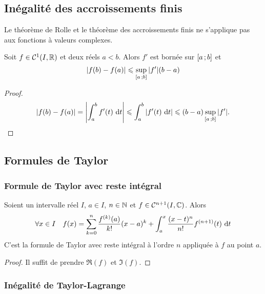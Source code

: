 \subsection{Inégalité des accroissements finis}

\danger Le théorème de Rolle et le théorème des accroissements finis ne s'applique pas aux fonctions à valeurs complexes.

\begin{prop}
  Soit \(f \in \mathcal{C}^{1}(I,\mathbb{R})\) et deux réels \(a<b\). Alors \(f'\) est bornée sur \(\left[ a \, ;  b \right]\) et
  \begin{equation}
    |f(b)-f(a)| \leqslant \sup\limits_{\left[ a \, ;  b \right]}|f'|(b-a)
  \end{equation}
\end{prop}
\begin{proof}
  \begin{equation}
    |f(b)-f(a)| = \left|\int_a^b f'(t)\,\mathop{}\mathopen{}\mathrm{d} t\right| \leqslant \int_a^b |f'(t)\,\mathop{}\mathopen{}\mathrm{d} t| \leqslant (b-a) \sup\limits_{\left[ a \, ;  b \right]}|f'|.
  \end{equation}
\end{proof}

\subsection{Formules de Taylor}

\subsubsection{Formule de Taylor avec reste intégral}

\begin{theo}
  Soient un intervalle réel \(I\), \(a \in I\), \(n \in \mathbb{N}\) et \(f \in \mathcal{C}^{{n+1}}(I,\mathbb{C})\). Alors
  \begin{equation}
    \forall x \in I \quad f(x) = \sum_{k=0}^n \frac{f^{(k)}(a)}{k!}(x-a)^k + \int_a^x \frac{(x-t)^n}{n!} f^{(n+1)}(t)\,\mathop{}\mathopen{}\mathrm{d} t
  \end{equation}
  C'est la formule de Taylor avec reste intégral à l'ordre \(n\) appliquée à \(f\) au point \(a\).
\end{theo}
\begin{proof}
  Il suffit de prendre \(\Re(f)\) et \(\Im(f)\).
\end{proof}

\subsubsection{Inégalité de Taylor-Lagrange}

